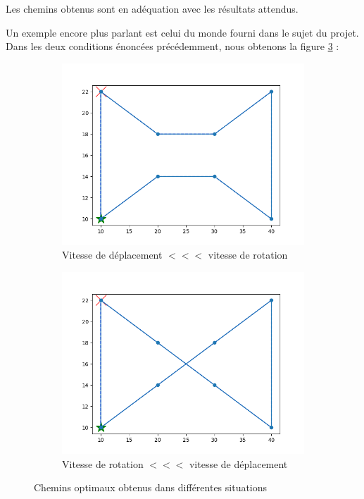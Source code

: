 \documentclass[12pt]{article}
\begin{document}
    Les chemins obtenus sont en adéquation avec les résultats attendus.

    \medskip

    Un exemple encore plus parlant est celui du monde fourni dans le sujet du projet. Dans les deux conditions énoncées précédemment, nous obtenons la figure \ref{fig:terrain2} :

    \begin{figure}[H]
        \centering
        \begin{subfigure}{0.35\textwidth}
          \centering
          \includegraphics[width=\linewidth]{img/terrain2mvt}
          \caption{Vitesse de déplacement $<<<$ vitesse de rotation}
          \label{subfig:terrain2mvt}
        \end{subfigure}
        \hfill
        \begin{subfigure}{0.35\textwidth}
          \centering
          \includegraphics[width=\linewidth]{img/terrain2rot}
          \caption{Vitesse de rotation $<<<$ vitesse de déplacement}
          \label{subfig:terrain2rot}
        \end{subfigure}
        \caption{Chemins optimaux obtenus dans différentes situations}
        \label{fig:terrain2}
    \end{figure}
\end{document}
